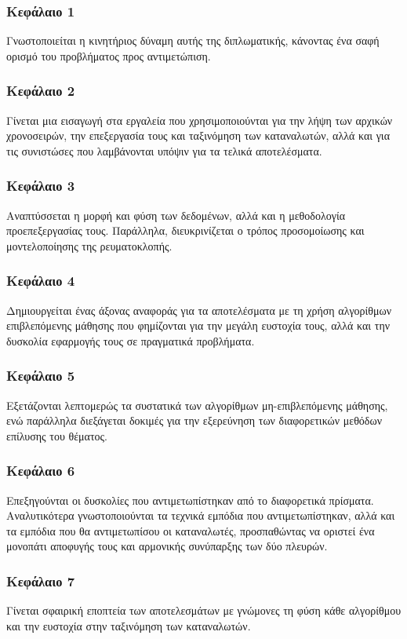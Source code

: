 \subsubsection{Κεφάλαιο 1}
Γνωστοποιείται η κινητήριος δύναμη αυτής της διπλωματικής, κάνοντας ένα σαφή ορισμό του προβλήματος προς αντιμετώπιση.
\subsubsection{Κεφάλαιο 2}
Γίνεται μια εισαγωγή στα εργαλεία που χρησιμοποιούνται για την λήψη των αρχικών χρονοσειρών, την επεξεργασία τους και ταξινόμηση των καταναλωτών, αλλά και για τις συνιστώσες που λαμβάνονται υπόψιν για τα τελικά αποτελέσματα.
\subsubsection{Κεφάλαιο 3}
Αναπτύσσεται η μορφή και φύση των δεδομένων, αλλά και η μεθοδολογία προεπεξεργασίας τους. Παράλληλα, διευκρινίζεται ο τρόπος προσομοίωσης και μοντελοποίησης της ρευματοκλοπής.
\subsubsection{Κεφάλαιο 4}
Δημιουργείται ένας άξονας αναφοράς για τα αποτελέσματα με τη χρήση αλγορίθμων επιβλεπόμενης μάθησης που φημίζονται για την μεγάλη ευστοχία τους, αλλά και την δυσκολία εφαρμογής τους σε πραγματικά προβλήματα.
\subsubsection{Κεφάλαιο 5}
Εξετάζονται λεπτομερώς τα συστατικά των αλγορίθμων μη-επιβλεπόμενης μάθησης, ενώ παράλληλα διεξάγεται δοκιμές για την εξερεύνηση των διαφορετικών μεθόδων επίλυσης του θέματος.
\subsubsection{Κεφάλαιο 6}
Επεξηγούνται οι δυσκολίες που αντιμετωπίστηκαν από το διαφορετικά πρίσματα. Αναλυτικότερα γνωστοποιούνται τα τεχνικά εμπόδια που αντιμετωπίστηκαν, αλλά και τα εμπόδια που θα αντιμετωπίσου οι καταναλωτές, προσπαθώντας να οριστεί ένα μονοπάτι αποφυγής τους και αρμονικής συνύπαρξης των δύο πλευρών.
\subsubsection{Κεφάλαιο 7}
Γίνεται σφαιρική εποπτεία των αποτελεσμάτων με γνώμονες τη φύση κάθε αλγορίθμου και την ευστοχία στην ταξινόμηση των καταναλωτών.